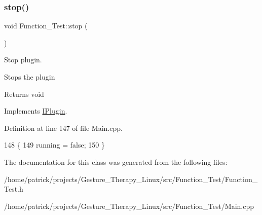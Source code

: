 \subsubsection{\texorpdfstring{stop()}{stop()}}
{\footnotesize\ttfamily void Function\+\_\+\+Test\+::stop (\begin{DoxyParamCaption}{ }\end{DoxyParamCaption})\hspace{0.3cm}{\ttfamily [virtual]}}



Stop plugin. 

Stops the plugin \begin{DoxyReturn}{Returns}
void 
\end{DoxyReturn}


Implements \hyperlink{class_i_plugin_a86e523c283aec5c9fb21249a76e916ac}{I\+Plugin}.



Definition at line 147 of file Main.\+cpp.


\begin{DoxyCode}
148 \{
149     running = \textcolor{keyword}{false};
150 \}
\end{DoxyCode}


The documentation for this class was generated from the following files\+:\begin{DoxyCompactItemize}
\item 
/home/patrick/projects/\+Gesture\+\_\+\+Therapy\+\_\+\+Linux/src/\+Function\+\_\+\+Test/Function\+\_\+\+Test.\+h\item 
/home/patrick/projects/\+Gesture\+\_\+\+Therapy\+\_\+\+Linux/src/\+Function\+\_\+\+Test/Main.\+cpp\end{DoxyCompactItemize}
